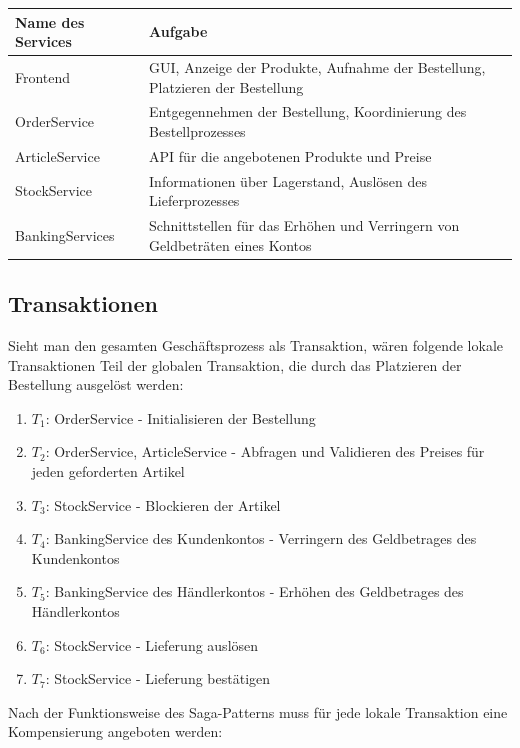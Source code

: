 \begin{center}
	\begin{tabular}[h]{|p{3.5cm}|p{12cm}|}
		\hline
		Name des Services & Aufgabe \\ \hline
		Frontend & GUI, Anzeige der Produkte, Aufnahme der Bestellung, Platzieren der Bestellung \\ \hline
		OrderService & Entgegennehmen der Bestellung, Koordinierung des Bestellprozesses \\ \hline
		ArticleService & API für die angebotenen Produkte und Preise \\ \hline
		StockService & Informationen über Lagerstand, Auslösen des Lieferprozesses \\ \hline
		BankingServices & Schnittstellen für das Erhöhen und Verringern von Geldbeträten eines Kontos \\ \hline
	\end{tabular}
\end{center}

\subsection{Transaktionen}
Sieht man den gesamten Geschäftsprozess als Transaktion, wären folgende lokale Transaktionen Teil der globalen Transaktion, die durch das Platzieren der Bestellung ausgelöst werden:
\begin{enumerate}
	\item $T_1$: OrderService - Initialisieren der Bestellung
	\item $T_2$: OrderService, ArticleService - Abfragen und Validieren des Preises für jeden geforderten Artikel 
	\item $T_3$: StockService - Blockieren der Artikel
	\item $T_4$: BankingService des Kundenkontos - Verringern des Geldbetrages des Kundenkontos
	\item $T_5$: BankingService des Händlerkontos - Erhöhen des Geldbetrages des Händlerkontos
	\item $T_6$: StockService - Lieferung auslösen
	\item $T_7$: StockService - Lieferung bestätigen
\end{enumerate}

Nach der Funktionsweise des Saga-Patterns muss für jede lokale Transaktion eine Kompensierung angeboten werden:

